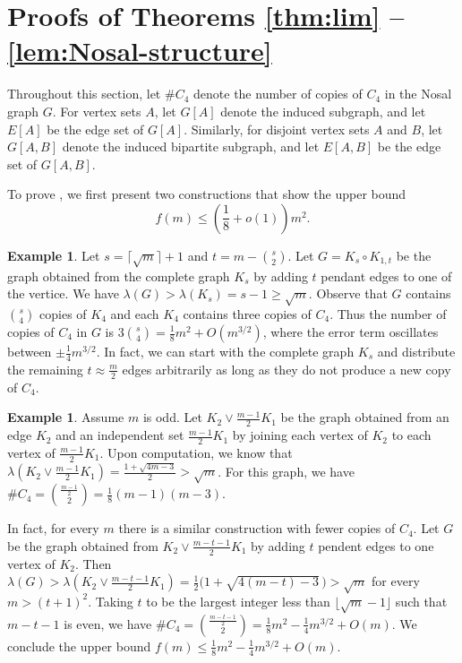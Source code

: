 \documentclass[11pt,a4paper]{article}
\theoremstyle{definition}
\newtheorem{example}[theorem]{Example}
\theoremstyle{remark}
\newcommand{\ceil}[1]{\lceil #1\rceil}
\newcommand{\floor}[1]{\lfloor #1\rfloor}
\begin{document}
\section{Proofs of Theorems \ref{thm:lim} -- \ref{lem:Nosal-structure}}


\label{sec-4} 

Throughout this section, let $\# C_4$ denote the number of copies of $C_4$ in the Nosal graph $G$. For vertex sets $A$, let $G[A]$ denote the induced subgraph, and let $E[A]$ be the edge set of $G[A]$. Similarly, for disjoint vertex sets $A$ and $B$, let $G[A, B]$ denote the induced bipartite subgraph, and let $E[A, B]$ be the edge set of $G[A, B]$.

To prove , 
we first present two constructions that show the upper bound 
\[ f(m) \leq \left( \frac{1}{8} + o(1)\right)m^2. \] 

\begin{example} \label{exam-C4-1}
Let $s= \ceil{\sqrt{m}} +1$  and $t=m- {s \choose 2}$.  
Let $G = K_s\circ K_{1,t}$ be the graph obtained 
from the complete graph $K_s$ by adding $t$ pendant edges to one of the vertice. We have $\lambda(G) > \lambda (K_s) = s - 1 \geq \sqrt{m}$. 
 Observe that $G$ contains ${s \choose 4}$ 
 copies of $K_4$ and each $K_4$ contains three copies of $C_4$. 
 Thus the number of copies of $C_4$ in $G$ is $3 {s\choose 4} =  \frac{1}{8}m^2 + O(m^{3/2})$, where the error term oscillates between $\pm \frac{1}{4} m^{3/2}$. In fact, we can start with the complete graph $K_{s}$ and distribute the remaining $t \approx \frac{m}{2}$ edges arbitrarily 
 as long as they do not produce a new copy of $C_4$.  
 \end{example}

 
 
\begin{example}  \label{exam-C4-2}
Assume $m$ is odd. Let $K_2 \vee \frac{m-1}{2}K_{1}$ be the graph obtained from 
an edge $K_2$ and an independent set
$\frac{m-1}{2}K_1$ 
by joining each vertex of $K_2$ to each vertex of $\frac{m-1}{2}K_1$. Upon computation, we know that 
$\lambda (K_2 \vee \frac{m-1}{2}K_1) = \frac{1+\sqrt{4m-3}}{2} > 
\sqrt{m}$. For this graph, we have $\# C_4={\frac{m-1}{2} \choose 2}= \frac{1}{8}(m-1)(m-3)$.  

In fact,  for every $m$ there is a similar construction with fewer copies of $C_4$.
Let $G$ be the graph obtained from 
$K_2\vee \frac{m-t-1}{2}K_1$ by adding $t$ pendent edges to 
one vertex of $K_2$. 
Then $\lambda (G) > 
\lambda (K_2\vee \frac{m-t-1}{2}K_1) = 
\frac{1}{2}\bigl(1+\sqrt{4(m-t)-3}\, \bigr) > \sqrt{m}$ for every $m> (t+1)^2$. Taking $t$ to be the largest integer less than $\floor{\sqrt{m}-1}$ such that $m - t - 1$ is even, we have $\#C_4 = {\frac{m-t-1}{2} \choose 2}= 
\frac{1}{8}m^2 - \frac{1}{4}m^{3/2} + O(m)$. We conclude the upper bound
$f(m) \leq \frac{1}{8}m^2 - \frac{1}{4}m^{3/2} + O(m)$. 
\end{example}
\end{document}
